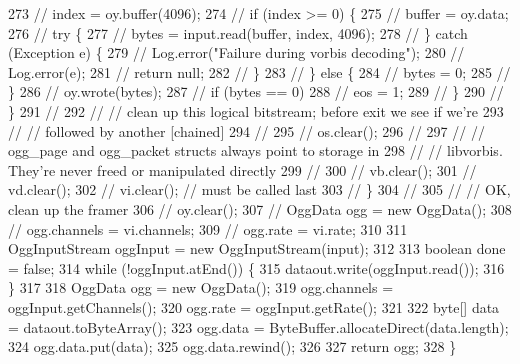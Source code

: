 \begin{DoxyCode}
273 \textcolor{comment}{//                  index = oy.buffer(4096);}
274 \textcolor{comment}{//                  if (index >= 0) \{}
275 \textcolor{comment}{//                      buffer = oy.data;}
276 \textcolor{comment}{//                      try \{}
277 \textcolor{comment}{//                          bytes = input.read(buffer, index, 4096);}
278 \textcolor{comment}{//                      \} catch (Exception e) \{}
279 \textcolor{comment}{//                          Log.error("Failure during vorbis decoding");}
280 \textcolor{comment}{//                          Log.error(e);}
281 \textcolor{comment}{//                          return null;}
282 \textcolor{comment}{//                      \}}
283 \textcolor{comment}{//                  \} else \{}
284 \textcolor{comment}{//                      bytes = 0;}
285 \textcolor{comment}{//                  \}}
286 \textcolor{comment}{//                  oy.wrote(bytes);}
287 \textcolor{comment}{//                  if (bytes == 0)}
288 \textcolor{comment}{//                      eos = 1;}
289 \textcolor{comment}{//              \}}
290 \textcolor{comment}{//          \}}
291 \textcolor{comment}{//}
292 \textcolor{comment}{//          // clean up this logical bitstream; before exit we see if we're}
293 \textcolor{comment}{//          // followed by another [chained]}
294 \textcolor{comment}{//}
295 \textcolor{comment}{//          os.clear();}
296 \textcolor{comment}{//}
297 \textcolor{comment}{//          // ogg\_page and ogg\_packet structs always point to storage in}
298 \textcolor{comment}{//          // libvorbis.  They're never freed or manipulated directly}
299 \textcolor{comment}{//}
300 \textcolor{comment}{//          vb.clear();}
301 \textcolor{comment}{//          vd.clear();}
302 \textcolor{comment}{//          vi.clear(); // must be called last}
303 \textcolor{comment}{//      \}}
304 \textcolor{comment}{//}
305 \textcolor{comment}{//      // OK, clean up the framer}
306 \textcolor{comment}{//      oy.clear();}
307 \textcolor{comment}{//      OggData ogg = new OggData();}
308 \textcolor{comment}{//      ogg.channels = vi.channels;}
309 \textcolor{comment}{//      ogg.rate = vi.rate;}
310 
311         OggInputStream oggInput = \textcolor{keyword}{new} OggInputStream(input);
312         
313         \textcolor{keywordtype}{boolean} done = \textcolor{keyword}{false};
314         \textcolor{keywordflow}{while} (!oggInput.atEnd()) \{
315             dataout.write(oggInput.read());
316         \}
317     
318         OggData ogg = \textcolor{keyword}{new} OggData();
319         ogg.channels = oggInput.getChannels();
320         ogg.rate = oggInput.getRate();
321         
322         byte[] data = dataout.toByteArray();
323         ogg.data = ByteBuffer.allocateDirect(data.length);
324         ogg.data.put(data);
325         ogg.data.rewind();
326         
327         \textcolor{keywordflow}{return} ogg;
328     \}
\end{DoxyCode}


